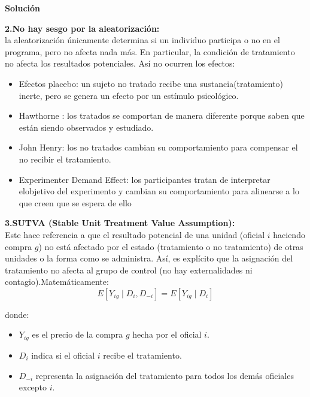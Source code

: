 \documentclass[a4paper, answers, addpoints, 11pt]{exam}
\newenvironment{solucion}{%
  \begin{mdframed}[
    backgroundcolor=blue!5,    %
    linecolor=blue!50,          %
    linewidth=2pt,              %
    leftmargin=10pt,            %
    rightmargin=8pt,           %
    topline=true,              %
    bottomline=true,            %
    roundcorner=10pt,           %
    innerleftmargin=10pt,       %
    innerrightmargin=10pt,      %
    innerbottommargin=10pt,     %
    innertopmargin=10pt         %
  ]%
  \begin{tcolorbox}[colframe=blue!50!black, colback=blue!50, coltitle=white, sharp corners=all, boxrule=1mm, width=\textwidth, halign=left, valign=center, top=0mm, bottom=0mm, left=0mm, right=0mm] \textbf{Solución} \end{tcolorbox} }{\end{mdframed}}
\begin{document}
\begin{enumerate}
\begin{solucion}
\begin{mdframed}[backgroundcolor=moraditoClaro]
 \end{mdframed}   

\textbf{2.No hay sesgo por la aleatorización:}\\ la aleatorización únicamente determina si un individuo participa o no en el programa, pero no afecta nada más. En particular,  la condición de tratamiento no afecta los resultados potenciales. Así no ocurren los efectos:
\begin{itemize}
    \item Efectos placebo: un sujeto no tratado recibe una sustancia(tratamiento) inerte, pero se genera un efecto por un estímulo psicológico.
    \item Hawthorne : los tratados se comportan de manera diferente porque saben que están siendo observados y estudiado.
    \item John Henry:  los no tratados cambian su comportamiento para compensar el no recibir el tratamiento.
    \item Experimenter Demand Effect: los participantes tratan de interpretar elobjetivo del experimento y cambian su comportamiento para alinearse a lo que creen que se espera de ello
\end{itemize}

\textbf{3.SUTVA (Stable Unit Treatment Value Assumption):}\\
Este hace referencia a que el resultado potencial de una unidad (oficial $i$ haciendo compra $g$) no está afectado por el estado (tratamiento o no tratamiento) de otras unidades o la forma como se administra. Así, es explícito que  la asignación del tratamiento no afecta al grupo de control (no hay externalidades ni contagio).Matemáticamente:
\[
E[Y_{ig} \mid D_i, D_{-i}] = E[Y_{ig} \mid D_i]
\]

donde:
\begin{itemize}
    \item \( Y_{ig} \) es el precio de la compra \( g \) hecha por el oficial \( i \).
    \item \( D_i \) indica si el oficial \( i \) recibe el tratamiento.
    \item \( D_{-i} \) representa la asignación del tratamiento para todos los demás oficiales excepto \( i \).
\end{itemize}
    \end{solucion}

   


\end{enumerate}
\end{document}
